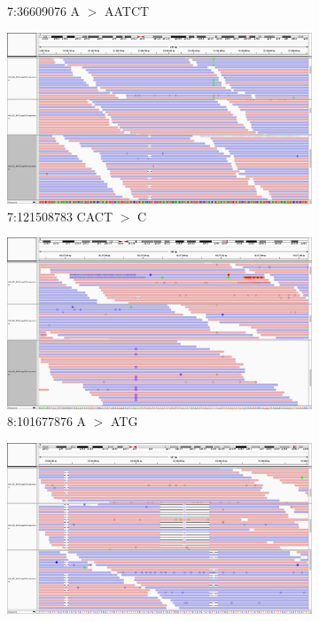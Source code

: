 \documentclass{article}
\begin{document}
\begin{landscape}
\begin{figure}[ht!]
\begin{subfigure}[b]{0.33\textwidth}
        \caption{\tiny 7:36609076 A $>$ AATCT}
    \end{subfigure}
    \begin{subfigure}[b]{0.33\textwidth}
        \includegraphics[width=\textwidth]{figures/7_121508783_CACTdel}
        \caption{\tiny 7:121508783 CACT $>$ C}
    \end{subfigure}
    \begin{subfigure}[b]{0.33\textwidth}
        \includegraphics[width=\textwidth]{figures/8_101677876_ATGins}
        \caption{\tiny 8:101677876 A $>$ ATG}
    \end{subfigure}
    \begin{subfigure}[b]{0.33\textwidth}
        \includegraphics[width=\textwidth]{figures/9_132946014_TCTTCdel}

\end{subfigure}
\end{figure}
\end{landscape}
\end{document}
